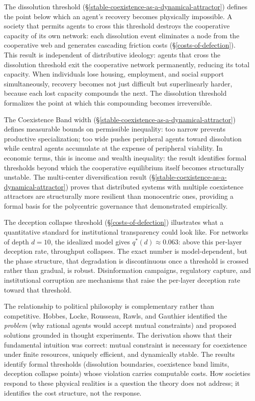 \documentclass[11pt]{article}
\theoremstyle{plain}
\theoremstyle{definition}
\theoremstyle{remark}
\begin{document}
The dissolution threshold
(§\ref{stable-coexistence-as-a-dynamical-attractor}) defines the point
below which an agent's recovery becomes physically impossible. A society
that permits agents to cross this threshold destroys the cooperative
capacity of its own network: each dissolution event eliminates a node
from the cooperative web and generates cascading friction costs
(§\ref{costs-of-defection}). This result is independent of distributive
ideology: agents that cross the dissolution threshold exit the
cooperative network permanently, reducing its total capacity. When
individuals lose housing, employment, and social support simultaneously,
recovery becomes not just difficult but superlinearly harder, because
each lost capacity compounds the next. The dissolution threshold
formalizes the point at which this compounding becomes irreversible.

The Coexistence Band width
(§\ref{stable-coexistence-as-a-dynamical-attractor}) defines measurable
bounds on permissible inequality: too narrow prevents productive
specialization; too wide pushes peripheral agents toward dissolution
while central agents accumulate at the expense of peripheral viability.
In economic terms, this is income and wealth inequality: the result
identifies formal thresholds beyond which the cooperative equilibrium
itself becomes structurally unstable. The multi-center diversification
result (§\ref{stable-coexistence-as-a-dynamical-attractor}) proves that
distributed systems with multiple coexistence attractors are
structurally more resilient than monocentric ones, providing a formal
basis for the polycentric governance that \citeauthor{Ostrom1990}
\citetext{\citeyear{Ostrom1990}; \citeyear{Ostrom2005}} demonstrated
empirically.

The deception collapse threshold (§\ref{costs-of-defection}) illustrates
what a quantitative standard for institutional transparency could look
like. For networks of depth \(d = 10\), the idealized model gives
\(q^*(d) \approx 0.063\): above this per-layer deception rate,
throughput collapses. The exact number is model-dependent, but the phase
structure, that degradation is discontinuous once a threshold is crossed
rather than gradual, is robust. Disinformation campaigns, regulatory
capture, and institutional corruption are mechanisms that raise the
per-layer deception rate toward that threshold.

The relationship to political philosophy is complementary rather than
competitive. Hobbes, Locke, Rousseau, Rawls, and Gauthier identified the
\emph{problem} (why rational agents would accept mutual constraints) and
proposed solutions grounded in thought experiments. The derivation shows
that their fundamental intuition was correct: mutual constraint is
necessary for coexistence under finite resources, uniquely efficient,
and dynamically stable. The results identify formal thresholds
(dissolution boundaries, coexistence band limits, deception collapse
points) whose violation carries computable costs. How societies respond
to these physical realities is a question the theory does not address;
it identifies the cost structure, not the response.
\end{document}
